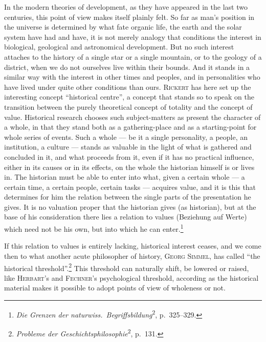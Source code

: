 \documentclass[12pt]{book}
\newcommand{\opage}[1]{\marginnote{\footnotesize\textit{[#1]}}}
\begin{document}
\opage{71}In the modern theories of development, as they have appeared in the last two centuries,
this point of view makes itself plainly felt. So far as man's position in the universe
is determined by what fate organic life, the earth and the solar system have had and
have, it is not merely analogy that conditions the interest in biological, geological
and astronomical development. But no such interest attaches to the history of a single
star or a single mountain, or to the geology of a district, when we do not ourselves
live within their bounds. And it stands in a similar way with the interest in other
times and peoples, and in personalities who have lived under quite other conditions than
ours. \textsc{Rickert} has here set up the interesting concept ``historical centre'', a
concept that stands so to speak on the transition between the purely theoretical concept
of totality and the concept of value. Historical research chooses such subject-matters as
present the character of a whole, in that they stand both as a gathering-place and as a
starting-point for whole series of events. Such a whole --- be it a single personality, a
people, an institution, a culture --- stands as valuable in the light of what is gathered
and concluded in it, and what proceeds from it, even if it has no practical influence,
either in its causes or in its effects, on the whole the historian himself is or lives
in. The historian must be able to enter into what, given a certain whole --- a certain
time, a certain people, certain tasks --- acquires value, and it is this that determines
for him the relation between the single parts of the presentation he gives. It is no
valuation proper that the historian gives (as historian), but at the base of his
consideration there lies a relation to values (Beziehung auf Werte) which need not be his
own, but into which he can enter.\footnote{\textit{Die Grenzen der naturwiss.\
Begriffsbildung}\textsuperscript{2}, p.\ 325--329.}

If this relation to values is entirely lacking, historical interest ceases, and we come
then to what another acute philosopher of history, \textsc{Georg Simmel}, has called
``the historical threshold''.\footnote{\textit{Probleme der
Geschichtsphilosophie}\textsuperscript{2}, p.\ 131.} This threshold can naturally shift,
be lowered or raised, like \textsc{Herbart}'s and \textsc{Fechner}'s psychological
threshold, according as the historical material makes it possible to adopt points of view
of wholeness or not.
\end{document}

